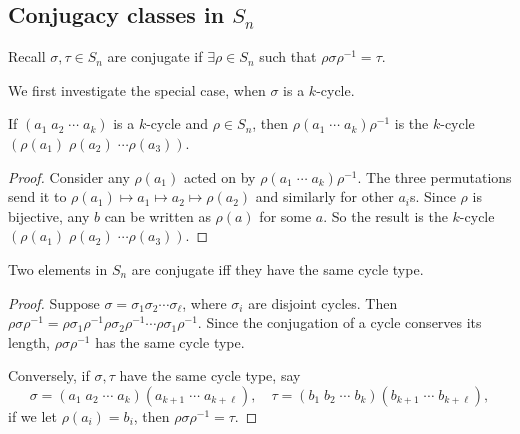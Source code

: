 \documentclass[a4paper]{article}
\begin{document}
\subsection{Conjugacy classes in \texorpdfstring{$S_n$}{Sn}}
Recall $\sigma, \tau\in S_n$ are conjugate if $\exists \rho\in S_n$ such that $\rho \sigma\rho^{-1} = \tau$.

We first investigate the special case, when $\sigma$ is a $k$-cycle.
\begin{prop}
  If $(a_1\; a_2\; \cdots \; a_k)$ is a $k$-cycle and $\rho\in S_n$, then $\rho (a_1\; \cdots\; a_k)\rho^{-1}$ is the $k$-cycle $(\rho(a_1)\; \rho(a_2)\; \cdots \rho(a_3))$.
\end{prop}

\begin{proof}
  Consider any $\rho(a_1)$ acted on by $\rho (a_1\; \cdots\; a_k)\rho^{-1}$. The three permutations send it to $\rho(a_1)\mapsto a_1 \mapsto a_2 \mapsto \rho(a_2)$ and similarly for other $a_i$s. Since $\rho$ is bijective, any $b$ can be written as $\rho(a)$ for some $a$. So the result is the $k$-cycle $(\rho(a_1)\; \rho(a_2)\; \cdots \rho(a_3))$.
\end{proof}

\begin{cor}
  Two elements in $S_n$ are conjugate iff they have the same cycle type.
\end{cor}

\begin{proof}
  Suppose $\sigma = \sigma_1\sigma_2\cdots \sigma_\ell$, where $\sigma_i$ are disjoint cycles. Then $\rho\sigma\rho^{-1} = \rho\sigma_1\rho^{-1}\rho\sigma_2\rho^{-1}\cdots \rho\sigma_1\rho^{-1}$. Since the conjugation of a cycle conserves its length, $\rho\sigma\rho^{-1}$ has the same cycle type.

  Conversely, if $\sigma, \tau$ have the same cycle type, say
  \[
    \sigma = (a_1\; a_2\;\cdots\; a_k)(a_{k + 1}\; \cdots \;a_{k + \ell}),\quad \tau = (b_1\; b_2\;\cdots\; b_k)(b_{k + 1}\; \cdots \;b_{k + \ell}),
  \]
  if we let $\rho(a_i) = b_i$, then $\rho\sigma\rho^{-1} = \tau$.
\end{proof}
\end{document}
